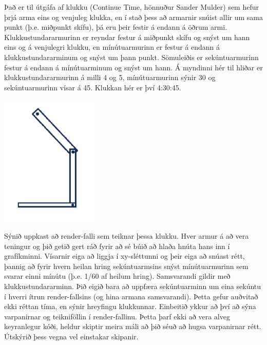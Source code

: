 \documentclass{article}
\begin{document}
Það er til útgáfa af klukku (Continue Time, hönnuður Sander Mulder) sem hefur
þrjá arma eins og venjuleg klukka, en í stað þess að armarnir
snúist allir um sama punkt (þ.e. miðpunkt skífu), þá eru þeir
festir á endann á öðrum armi. Klukkustundararmurinn er
reyndar festur á miðpunkt skífu og snýst um hann eins og á
venjulegri klukku, en mínútuarmurinn er festur á endann á
klukkustundararminum og snýst um þann punkt. Sömuleiðis
er sekúntuarmurinn festur á endann á mínútuarminum og
snýst um hann. Á myndinni hér til hliðar er
klukkustundararmurinn á milli 4 og 5, mínútuarmurinn sýnir
30 og sekúntuarmurinn vísar á 45. Klukkan hér er því
4:30:45.

\includegraphics[scale = 0.9]{klukka.png}

Sýnið uppkast að render-falli sem teiknar þessa klukku. Hver armur á að vera
teningur og þið getið gert ráð fyrir að sé búið að hlaða hnúta hans inn í
grafíkminni. Vísarnir eiga að liggja í xy-sléttunni og þeir eiga að snúast rétt,
þannig að fyrir hvern heilan hring sekúntuarmsins snýst mínútuarmurinn sem
svarar einni mínútu (þ.e. 1/60 af heilum hring). Samsvarandi gildir með
klukkustundararminn. Þið eigið bara að uppfæra sekúntuarminn um eina sekúntu í
hverri ítrun render-fallsins (og hina armana samsvarandi). Þetta gefur auðvitað
ekki réttan tíma, en sýnir hreyfingu klukkunnar.
Einbeitið ykkur að því að sýna varpanirnar og teikniföllin í render-fallinu. Þetta
þarf ekki að vera alveg keyranlegur kóði, heldur skiptir meira máli að þið séuð að
hugsa varpanirnar rétt. Útskýrið þess vegna vel einstakar skipanir.

\newpage
\end{document}
